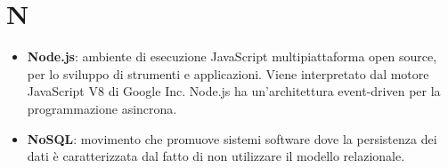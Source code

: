 \section{N}
\begin{itemize}
	\item \textbf{Node.js}: ambiente di esecuzione JavaScript multipiattaforma open source, per lo sviluppo di strumenti e applicazioni. Viene interpretato dal motore JavaScript V8 di Google Inc. Node.js ha un'architettura event-driven per la programmazione asincrona.
	\item \textbf{NoSQL}: movimento che promuove sistemi software dove la persistenza dei dati è caratterizzata dal fatto di non utilizzare il modello relazionale.
\end{itemize}